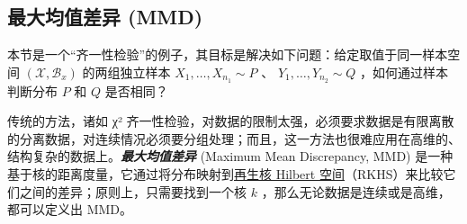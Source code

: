 \subsection{最大均值差异 (MMD)}

本节是一个``齐一性检验''的例子，其目标是解决如下问题：给定取值于同一样本空间 $(\mathscr X,\mathscr B_x)$ 的两组独立样本 $X_1,\dots,X_{n_1}\sim P$ 、 $Y_1,\dots,Y_{n_2}\sim Q$ ，如何通过样本判断分布 $P$ 和 $Q$ 是否相同？

传统的方法，诸如 χ² 齐一性检验，对数据的限制太强，必须要求数据是有限离散的分离数据，对连续情况必须要分组处理；而且，这一方法也很难应用在高维的、结构复杂的数据上。\textbf{\emph{最大均值差异}} (Maximum Mean Discrepancy, MMD) 是一种基于核的距离度量，它通过将分布映射到\href{https://en.wikipedia.org/wiki/Reproducing_kernel_Hilbert_space}{再生核 Hilbert 空间}（RKHS）来比较它们之间的差异；原则上，只需要找到一个核 $k$ ，那么无论数据是连续或是高维，都可以定义出 MMD。

